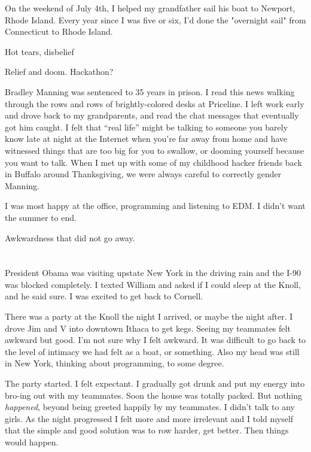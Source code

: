 On the weekend of July 4th, I helped my grandfather sail his boat to Newport,
Rhode Island.  Every year since I was five or six, I'd done the "overnight sail"
from Connecticut to Rhode Island.  

Hot tears, disbelief

Relief and doom. 
Hackathon?

Bradley Manning was sentenced to 35 years in prison.  I read this news walking
through the rows and rows of brightly-colored desks at Priceline.  I left work
early and drove back to my grandparents, and read the chat messages that
eventually got him caught.   I felt that ``real life'' might be talking to
someone you barely know late at night at the Internet when you're far away from
home and have witnessed things that are too big for you to swallow, or dooming
yourself because you want to talk.  When I met up with some of my childhood
hacker friends back in Buffalo around Thanksgiving, we were always careful to
correctly gender Manning.  

I was most happy at the office, programming and listening to EDM.  I didn't want
the summer to end.


Awkwardness that did not go away.

\section{}

President Obama was visiting upstate New York in the driving rain and the I-90
was blocked completely.  I texted William and asked if I could sleep at the
Knoll, and he said sure.  I was excited to get back to Cornell.


There was a party at the Knoll the night I arrived, or maybe the night after.  I
drove Jim and V into downtown Ithaca to get kegs.  Seeing my teammates felt
awkward but good.  I'm not sure why I felt awkward.  It was difficult to go back
to the level of intimacy we had felt as a boat, or something.  Also my head was
still in New York, thinking about programming, to some degree.    

The party started.  I felt expectant.  I gradually got drunk and put my energy
into bro-ing out with my teammates.  Soon the house was totally packed.  But
nothing \textit{happened}, beyond being greeted happily by my teammates.  I
didn't talk to any girls.  As the night progressed I felt more and more
irrelevant and I told myself that the simple and good solution was to row
harder, get better.  Then things would happen.

